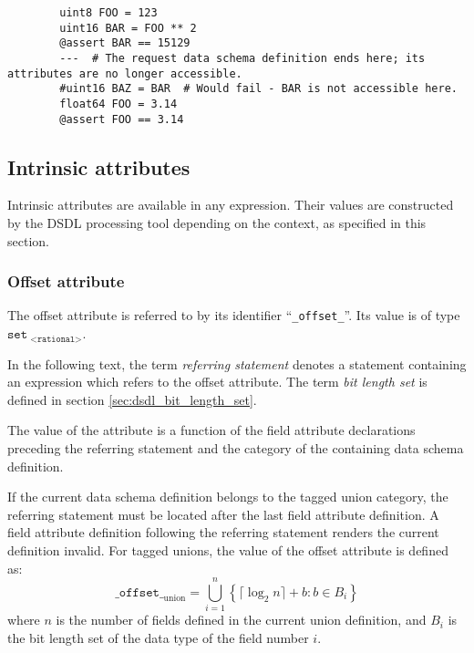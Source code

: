 \begin{remark}
    \begin{verbatim}
        uint8 FOO = 123
        uint16 BAR = FOO ** 2
        @assert BAR == 15129
        ---  # The request data schema definition ends here; its attributes are no longer accessible.
        #uint16 BAZ = BAR  # Would fail - BAR is not accessible here.
        float64 FOO = 3.14
        @assert FOO == 3.14
    \end{verbatim}
\end{remark}

\subsection{Intrinsic attributes}

Intrinsic attributes are available in any expression.
Their values are constructed by the DSDL processing tool depending on the context,
as specified in this section.

\subsubsection{Offset attribute}

The offset attribute is referred to by its identifier ``\verb|_offset_|''.
Its value is of type $\texttt{set}_\texttt{ <rational>}$.

In the following text, the term \emph{referring statement} denotes a statement
containing an expression which refers to the offset attribute.
The term \emph{bit length set} is defined in section \ref{sec:dsdl_bit_length_set}.

The value of the attribute is a function of the field attribute declarations preceding the referring statement
and the category of the containing data schema definition.

If the current data schema definition belongs to the tagged union category,
the referring statement must be located after the last field attribute definition.
A field attribute definition following the referring statement renders the current definition invalid.
For tagged unions, the value of the offset attribute is defined as:
$$
    \texttt{\_offset\_}_\text{union} =
    \bigcup\limits_{i=1}^{n}
    \left\{ \lceil{}\log_2 n\rceil{} + b : b \in B_i \right\}
$$
where $n$ is the number of fields defined in the current union definition,
and $B_i$ is the bit length set of the data type of the field number $i$.

